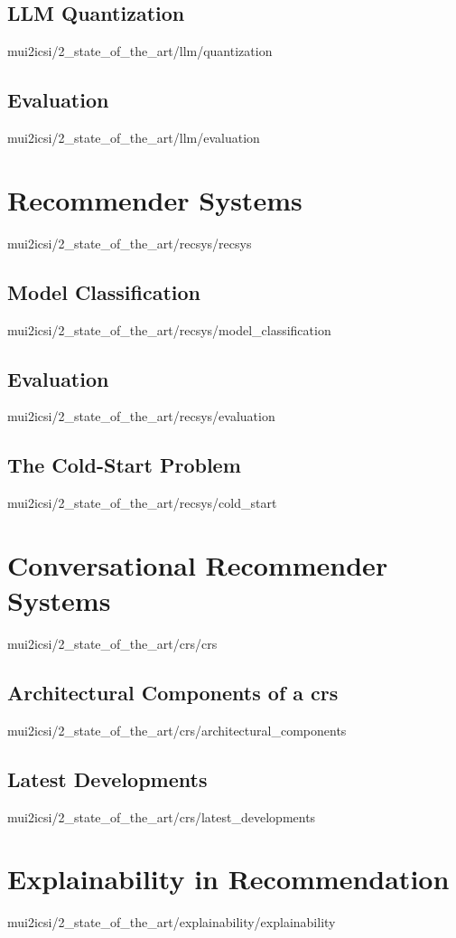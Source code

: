\documentclass[english,epsbased,copyright,final,printable,covers,extendedindex,firstnumbered,tfm,gnuplot,loc,loe,lof,lot]{tfgtfmthesisuam}
\begin{document}
      \subsection{LLM Quantization\label{SS:QUANTIZATION}}{mui2icsi/2_state_of_the_art/llm/quantization}
      \subsection{Evaluation\label{SS:EVALUATION}}{mui2icsi/2_state_of_the_art/llm/evaluation}

    \section{Recommender Systems\label{SEC:RECSYS}}{mui2icsi/2_state_of_the_art/recsys/recsys}
      \subsection{Model Classification\label{SS:MODELCLASS}}{mui2icsi/2_state_of_the_art/recsys/model_classification}
      \subsection{Evaluation\label{SS:RECSYSEVAL}}{mui2icsi/2_state_of_the_art/recsys/evaluation}
      \subsection{The Cold-Start Problem\label{SS:COLDSTART}}{mui2icsi/2_state_of_the_art/recsys/cold_start}

    \section{Conversational Recommender Systems\label{SEC:CRS}}{mui2icsi/2_state_of_the_art/crs/crs}
      \subsection{Architectural Components of a \acs{crs}\label{SS:CRSARCH}}{mui2icsi/2_state_of_the_art/crs/architectural_components}
      \subsection{Latest Developments\label{SS:CRSDEVS}}{mui2icsi/2_state_of_the_art/crs/latest_developments}

    \section{Explainability in Recommendation\label{SEC:EXPLAINABILITY}}{mui2icsi/2_state_of_the_art/explainability/explainability}
\end{document}
